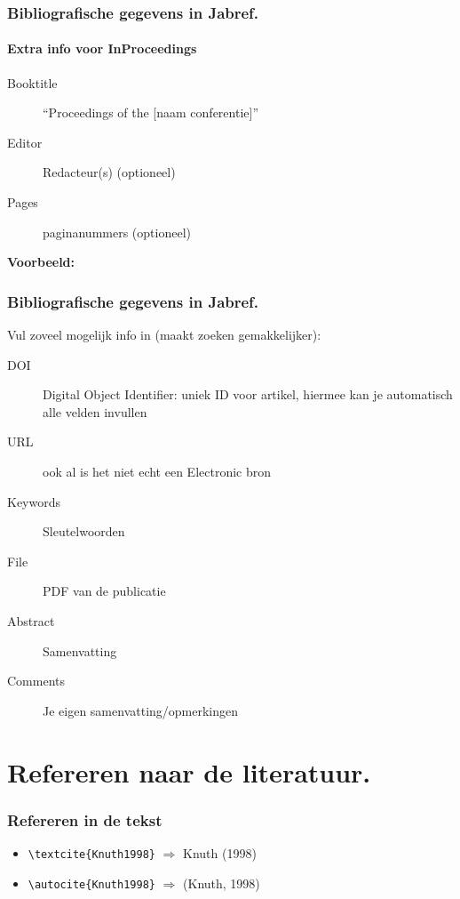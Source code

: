 \documentclass[aspectratio=169]{beamer}
\begin{document}
\begin{frame}[plain]
  \frametitle{Bibliografische gegevens in Jabref.}
  \framesubtitle{Extra info voor InProceedings}

  \begin{description}
    \item[Booktitle] ``Proceedings of the [naam conferentie]''
    \item[Editor] Redacteur(s) (optioneel)
    \item[Pages] paginanummers (optioneel)
  \end{description}

  \medskip

  \textbf{Voorbeeld:}

\end{frame}

\begin{frame}
  \frametitle{Bibliografische gegevens in Jabref.}

  Vul zoveel mogelijk info in (maakt zoeken gemakkelijker):

  \begin{description}
    \item[DOI] Digital Object Identifier: uniek ID voor artikel, hiermee kan je automatisch alle velden invullen
    \item[URL] ook al is het niet echt een Electronic bron
    \item[Keywords] Sleutelwoorden
    \item[File] PDF van de publicatie
    \item[Abstract] Samenvatting
    \item[Comments] Je eigen samenvatting/opmerkingen
  \end{description}

\end{frame}

\section{Refereren naar de literatuur.}

\begin{frame}[fragile]
  \frametitle{Refereren in de tekst}

  \begin{itemize}
    \item \verb|\textcite{Knuth1998}| \(\Rightarrow\) Knuth (1998)
    \item \verb|\autocite{Knuth1998}| \(\Rightarrow\) (Knuth, 1998)
  \end{itemize}

\end{frame}
\end{document}
